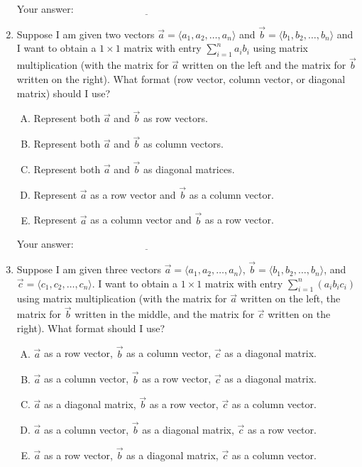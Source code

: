 \documentclass[10pt]{amsart}
\begin{document}
\begin{enumerate}
  \vspace{0.1in}
  Your answer: $\underline{\qquad\qquad\qquad\qquad\qquad\qquad\qquad}$
  \vspace{0.1in}

\item Suppose I am given two vectors $\vec{a} = \langle a_1,
  a_2,\dots,a_n \rangle$ and $\vec{b} = \langle b_1,b_2,\dots,b_n
  \rangle$ and I want to obtain a $1 \times 1$ matrix with entry
  $\sum_{i=1}^n a_ib_i$ using matrix multiplication (with the matrix
  for $\vec{a}$ written on the left and the matrix for $\vec{b}$
  written on the right). What format (row vector, column vector, or
  diagonal matrix) should I use?
  \begin{enumerate}[(A)]
  \item Represent both $\vec{a}$ and $\vec{b}$ as row vectors.
  \item Represent both $\vec{a}$ and $\vec{b}$ as column vectors.
  \item Represent both $\vec{a}$ and $\vec{b}$ as diagonal matrices.
  \item Represent $\vec{a}$ as a row vector and $\vec{b}$ as a column
    vector.
  \item Represent $\vec{a}$ as a column vector and $\vec{b}$ as a row vector.
  \end{enumerate}

  \vspace{0.1in}
  Your answer: $\underline{\qquad\qquad\qquad\qquad\qquad\qquad\qquad}$
  \vspace{0.1in}

\item Suppose I am given three vectors $\vec{a} = \langle
  a_1,a_2,\dots,a_n \rangle$, $\vec{b} = \langle b_1,b_2,\dots,b_n
  \rangle$, and $\vec{c} = \langle c_1,c_2,\dots,c_n \rangle$. I want
  to obtain a $1 \times 1$ matrix with entry $\sum_{i=1}^n
  (a_ib_ic_i)$ using matrix multiplication (with the matrix for
  $\vec{a}$ written on the left, the matrix for $\vec{b}$ written in
  the middle, and the matrix for $\vec{c}$ written on the right). What
  format should I use?

  \begin{enumerate}[(A)]
  \item $\vec{a}$ as a row vector, $\vec{b}$ as a column vector,
    $\vec{c}$ as a diagonal matrix.
  \item $\vec{a}$ as a column vector, $\vec{b}$ as a row vector,
    $\vec{c}$ as a diagonal matrix.
  \item $\vec{a}$ as a diagonal matrix, $\vec{b}$ as a row vector,
    $\vec{c}$ as a column vector.
  \item $\vec{a}$ as a column vector, $\vec{b}$ as a diagonal matrix,
    $\vec{c}$ as a row vector.
  \item $\vec{a}$ as a row vector, $\vec{b}$ as a diagonal matrix,
    $\vec{c}$ as a column vector.
  \end{enumerate}


\end{enumerate}
\end{document}
